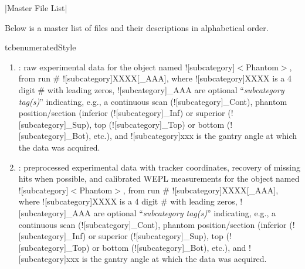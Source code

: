 \begin{tcbenvironment}|Master File List|
\begin{tcbContentsBox}
\tcbsectionheaderfont Below is a master list of files and their descriptions in alphabetical order.
\end{tcbContentsBox}
\begin{tcbparbox}{tcbenumeratedStyle}
\begin{enumerate}
    \item {} : raw experimental data for the object named \docentry![subcategory]{$<$Phantom$>$}, from run \# \docentry![subcategory]{XXXX[\_AAA]}, where \docentry![subcategory]{XXXX} is a 4 digit \# with leading zeros, \docentry![subcategory]{\_AAA} are optional ``\emph{subcategory tag(s)}'' indicating, e.g., a continuous scan (\docentry![subcategory]{\_Cont}), phantom position/section (inferior (\docentry![subcategory]{\_Inf}) or superior (\docentry![subcategory]{\_Sup}), top (\docentry![subcategory]{\_Top}) or bottom (\docentry![subcategory]{\_Bot}), etc.), and \docentry![subcategory]{xxx} is the gantry angle at which the data was acquired.
    \item {} : preprocessed experimental data with tracker coordinates, recovery of missing hits when possible, and calibrated WEPL measurements for the object named \docentry![subcategory]{$<$Phantom$>$}, from run \# \docentry![subcategory]{XXXX[\_AAA]}, where \docentry![subcategory]{XXXX} is a 4 digit \# with leading zeros, \docentry![subcategory]{\_AAA} are optional ``\emph{subcategory tag(s)}'' indicating, e.g., a continuous scan (\docentry![subcategory]{\_Cont}), phantom position/section (inferior (\docentry![subcategory]{\_Inf}) or superior (\docentry![subcategory]{\_Sup}), top (\docentry![subcategory]{\_Top}) or bottom (\docentry![subcategory]{\_Bot}), etc.), and \docentry![subcategory]{xxx} is the gantry angle at which the data was acquired.

\end{enumerate}
\end{tcbparbox}
\end{tcbenvironment}
